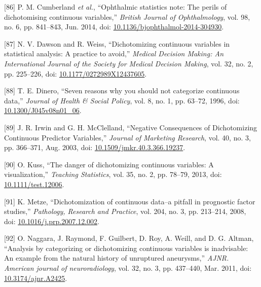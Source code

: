 \documentclass[12pt,PhD,twoside,openright]{muthesis}
\newenvironment{cslreferences}%
  {}%
  {\par}
\begin{document}
\begin{cslreferences}
\leavevmode\hypertarget{ref-cumberland_ophthalmic_2014-1}{}%
{[}86{]} P. M. Cumberland \emph{et al.}, ``Ophthalmic statistics note: The perils of dichotomising continuous variables,'' \emph{British Journal of Ophthalmology}, vol. 98, no. 6, pp. 841--843, Jun. 2014, doi: \href{https://doi.org/10.1136/bjophthalmol-2014-304930}{10.1136/bjophthalmol-2014-304930}.

\leavevmode\hypertarget{ref-dawson_dichotomizing_2012-1}{}%
{[}87{]} N. V. Dawson and R. Weiss, ``Dichotomizing continuous variables in statistical analysis: A practice to avoid,'' \emph{Medical Decision Making: An International Journal of the Society for Medical Decision Making}, vol. 32, no. 2, pp. 225--226, doi: \href{https://doi.org/10.1177/0272989X12437605}{10.1177/0272989X12437605}.

\leavevmode\hypertarget{ref-dinero_seven_1996-1}{}%
{[}88{]} T. E. Dinero, ``Seven reasons why you should not categorize continuous data,'' \emph{Journal of Health \& Social Policy}, vol. 8, no. 1, pp. 63--72, 1996, doi: \href{https://doi.org/10.1300/J045v08n01_06}{10.1300/J045v08n01\_06}.

\leavevmode\hypertarget{ref-irwin_negative_2003}{}%
{[}89{]} J. R. Irwin and G. H. McClelland, ``Negative Consequences of Dichotomizing Continuous Predictor Variables,'' \emph{Journal of Marketing Research}, vol. 40, no. 3, pp. 366--371, Aug. 2003, doi: \href{https://doi.org/10.1509/jmkr.40.3.366.19237}{10.1509/jmkr.40.3.366.19237}.

\leavevmode\hypertarget{ref-kuss_danger_2013}{}%
{[}90{]} O. Kuss, ``The danger of dichotomizing continuous variables: A visualization,'' \emph{Teaching Statistics}, vol. 35, no. 2, pp. 78--79, 2013, doi: \href{https://doi.org/10.1111/test.12006}{10.1111/test.12006}.

\leavevmode\hypertarget{ref-metze_dichotomization_2008}{}%
{[}91{]} K. Metze, ``Dichotomization of continuous data--a pitfall in prognostic factor studies,'' \emph{Pathology, Research and Practice}, vol. 204, no. 3, pp. 213--214, 2008, doi: \href{https://doi.org/10.1016/j.prp.2007.12.002}{10.1016/j.prp.2007.12.002}.

\leavevmode\hypertarget{ref-naggara_analysis_2011}{}%
{[}92{]} O. Naggara, J. Raymond, F. Guilbert, D. Roy, A. Weill, and D. G. Altman, ``Analysis by categorizing or dichotomizing continuous variables is inadvisable: An example from the natural history of unruptured aneurysms,'' \emph{AJNR. American journal of neuroradiology}, vol. 32, no. 3, pp. 437--440, Mar. 2011, doi: \href{https://doi.org/10.3174/ajnr.A2425}{10.3174/ajnr.A2425}.


\end{cslreferences}
\end{document}
